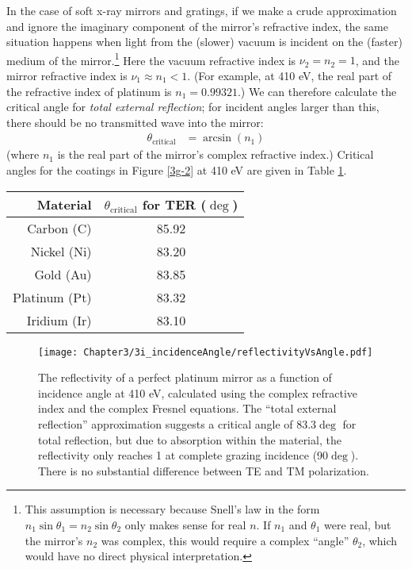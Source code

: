 In the case of soft x-ray mirrors and gratings, if we make a crude approximation and ignore the imaginary component of the mirror's refractive index, the same situation happens when light from the (slower) vacuum is incident on the (faster) medium of the mirror.\footnote{This assumption is necessary because Snell's law in the form $n_1 \sin \theta_1 = n_2 \sin \theta_2$ only makes sense for real $n$.  If $n_1$ and $\theta_1$ were real, but the mirror's $n_2$ was complex, this would require a complex ``angle'' $\theta_2$, which would have no direct physical interpretation.}
Here the vacuum refractive index is $\nu_2=n_2=1$, and the mirror refractive index is $\nu_1\approx n_1<1$.  (For example, at 410 eV, the real part of the refractive index of platinum is $n_1 = 0.99321$.)  We can therefore calculate the critical angle for \emph{total external reflection}; for incident angles larger than this, there should be no transmitted wave into the mirror:
\begin{align}
\theta_{\mathrm{critical}} &= \arcsin \left( n_1 \right)
\end{align}
(where $n_1$ is the real part of the mirror's complex refractive index.)  Critical angles for the coatings in Figure \ref{3g-2} at 410 eV are given in Table \ref{3i-2}.

\begin{table}[p]
   \centering
   \begin{tabular}{@{} r c @{}} %
\toprule
Material    & $\theta_{\mathrm{critical}}$ for TER ($\deg$)\\
\midrule
Carbon (C) & 85.92\\
Nickel (Ni) & 83.20\\
Gold (Au)& 83.85\\
Platinum (Pt)& 83.32\\
Iridium (Ir)& 83.10\\
\bottomrule
   \end{tabular}
   \label{3i-2}
\end{table}

\begin{figure}[p] %
   \centering
   \texttt{[image: Chapter3/3i\_incidenceAngle/reflectivityVsAngle.pdf]} 
   \caption[The reflectivity of a perfect platinum mirror as a function of incidence angle at 410 eV, calculated using the complex refractive index and the complex Fresnel equations.]{The reflectivity of a perfect platinum mirror as a function of incidence angle at 410 eV, calculated using the complex refractive index and the complex Fresnel equations.  The ``total external reflection'' approximation suggests a critical angle of 83.3$\deg$ for total reflection, but due to absorption within the material, the reflectivity only reaches 1 at complete grazing incidence (90$\deg$).  There is no substantial difference between TE and TM polarization.}
   \label{reflectionVsAngle}
\end{figure}

